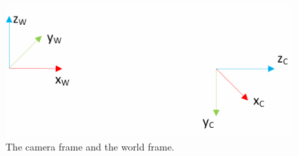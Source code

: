   
  
  
 \begin{figure}
    \centering
    \includegraphics[width=0.98\textwidth]{images/world_camera_frame.pdf}
    \caption{The camera frame and the world frame.}
    \label{pics:worldcamframe}
 \end{figure}
 
